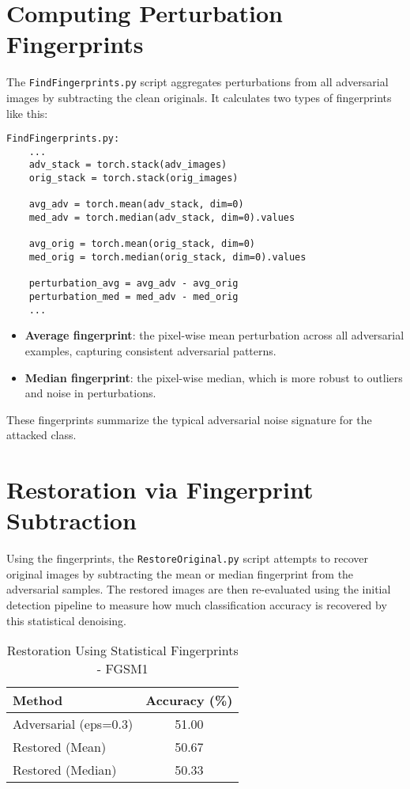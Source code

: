 \documentclass[a4paper,12pt]{report}
\begin{document}
\section{Computing Perturbation Fingerprints}
The \texttt{FindFingerprints.py} script aggregates perturbations from all adversarial images by subtracting the clean originals. It calculates two types of fingerprints like this:
\begin{verbatim}
FindFingerprints.py:
    ...
    adv_stack = torch.stack(adv_images)
    orig_stack = torch.stack(orig_images)
    
    avg_adv = torch.mean(adv_stack, dim=0)
    med_adv = torch.median(adv_stack, dim=0).values
    
    avg_orig = torch.mean(orig_stack, dim=0)
    med_orig = torch.median(orig_stack, dim=0).values
    
    perturbation_avg = avg_adv - avg_orig
    perturbation_med = med_adv - med_orig
    ...
\end{verbatim}
\begin{itemize}
    \item \textbf{Average fingerprint}: the pixel-wise mean perturbation across all adversarial examples, capturing consistent adversarial patterns.
    \item \textbf{Median fingerprint}: the pixel-wise median, which is more robust to outliers and noise in perturbations.
\end{itemize}

These fingerprints summarize the typical adversarial noise signature for the attacked class.

\section{Restoration via Fingerprint Subtraction}
Using the fingerprints, the \texttt{RestoreOriginal.py} script attempts to recover original images by subtracting the mean or median fingerprint from the adversarial samples. The restored images are then re-evaluated using the initial detection pipeline to measure how much classification accuracy is recovered by this statistical denoising.

\begin{table}[H]
\centering
\caption{Restoration Using Statistical Fingerprints - FGSM1}
\begin{tabular}{|l|c|}
\hline
Method & Accuracy (\%) \\
\hline
Adversarial (eps=0.3)       & 51.00 \\
Restored (Mean)   & 50.67 \\
Restored (Median) & 50.33 \\
\hline
\end{tabular}
\end{table}
\end{document}
